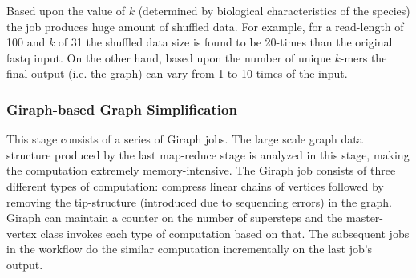 \documentclass[conference]{IEEEtran}
\begin{document}
Based upon the value of $k$ (determined by biological characteristics of the species) the job produces huge amount of shuffled data. 
For example, for a read-length of 100 and $k$ of 31 the shuffled data size is found to be 20-times than the original fastq input.
On the other hand, based upon the number of unique $k$-mers the final output (i.e. the graph) can vary from 1 to 10 times of the input. 

\subsubsection {Giraph-based Graph Simplification}
This stage consists of a series of Giraph jobs.
The large scale graph data structure produced by the last map-reduce stage is analyzed in this stage, making the computation extremely memory-intensive.
The Giraph job consists of three different types of computation: compress linear chains of vertices followed by removing the tip-structure (introduced due to sequencing errors) in the graph.
Giraph can maintain a counter on the number of supersteps and the master-vertex class invokes each type of computation based on that.
The subsequent jobs in the workflow do the similar computation incrementally on the last job's output.
\end{document}
